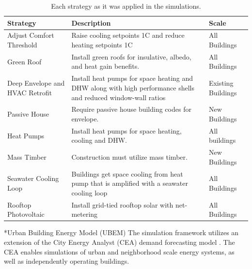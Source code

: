 \documentclass[twocolumn, a4paper,10pt]{article}
\makeatletter
\renewcommand\subsection{\@startsection{subsection}{1}{\z@}{\z@}{\z@}{\normalfont\normalsize\bfseries}}
\renewcommand\subsection{\@startsection{subsection}{1}{\z@}{\z@}{0.1pt}{\normalfont\normalsize\bfseries}}
\makeatother
\begin{document}
\begin{table}[ht]
    \vspace{-5pt}   %
    \caption{Each strategy as it was applied in the simulations.}
    \footnotesize
    \label{tab:strategies}
    \centering
    \begin{tabularx}{\textwidth}{|X|X|X|}
        \hline
        \bf{Strategy} & \bf{Description} & \bf{Scale} \\
        \hline
        Adjust Comfort Threshold & Raise cooling setpoints 1C and reduce heating setpoints 1C & All Buildings \\
        \hline
        Green Roof & Install green roofs for insulative, albedo, and heat gain benefits. & All Buildings \\
        \hline
        Deep Envelope and HVAC Retrofit & Install heat pumps for space heating and DHW along with high performance shells and reduced window-wall ratios & Existing Buildings \\
        \hline
        Passive House & Require passive house building codes for envelope. & New Buildings \\
        \hline
        Heat Pumps & Install heat pumps for space heating, cooling and DHW. & All buildings \\
        \hline
        Mass Timber & Construction must utilize mass timber. & New Buildings \\
        \hline
        Seawater Cooling Loop & Buildings get space cooling from heat pump that is amplified with a seawater cooling loop & All Buildings \\
        \hline
        Rooftop Photovoltaic & Install grid-tied rooftop solar with net-metering & All Buildings \\
        \hline
    \end{tabularx}
    \vspace{-5pt}   %
\end{table}

\subsection*{Urban Building Energy Model (UBEM)}
The simulation framework utilizes an extension of the City Energy Analyst (CEA) demand forecasting model \citep{fonseca_city_2016,the_cea_team_city_2020}. The CEA enables simulations of urban and neighborhood scale energy systems, as well as independently operating buildings. 
\end{document}
